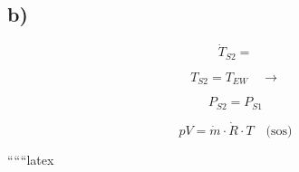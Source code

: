 

\subsection*{b)}

\[
\dot{T}_{S2} = 
\]

\[
T_{S2} = T_{EW} \quad \rightarrow
\]

\[
P_{S2} = P_{S1}
\]

\[
pV = \dot{m} \cdot \dot{R} \cdot T \quad \text{(sos)}
\]

``````latex